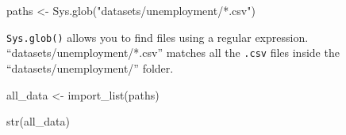 \documentclass[
]{article}
\newenvironment{Shaded}{\begin{snugshade}}{\end{snugshade}}
\newcommand{\FunctionTok}[1]{\textcolor[rgb]{0.00,0.00,0.00}{#1}}
\newcommand{\NormalTok}[1]{#1}
\newcommand{\OtherTok}[1]{\textcolor[rgb]{0.56,0.35,0.01}{#1}}
\newcommand{\StringTok}[1]{\textcolor[rgb]{0.31,0.60,0.02}{#1}}
\begin{document}
\begin{Shaded}
\begin{Highlighting}[]
\NormalTok{paths }\OtherTok{\textless{}{-}} \FunctionTok{Sys.glob}\NormalTok{(}\StringTok{"datasets/unemployment/*.csv"}\NormalTok{)}
\end{Highlighting}
\end{Shaded}

\texttt{Sys.glob()} allows you to find files using a regular expression. ``datasets/unemployment/*.csv''
matches all the \texttt{.csv} files inside the ``datasets/unemployment/'' folder.

\begin{Shaded}
\begin{Highlighting}[]
\NormalTok{all\_data }\OtherTok{\textless{}{-}} \FunctionTok{import\_list}\NormalTok{(paths)}

\FunctionTok{str}\NormalTok{(all\_data)}
\end{Highlighting}
\end{Shaded}
\end{document}
